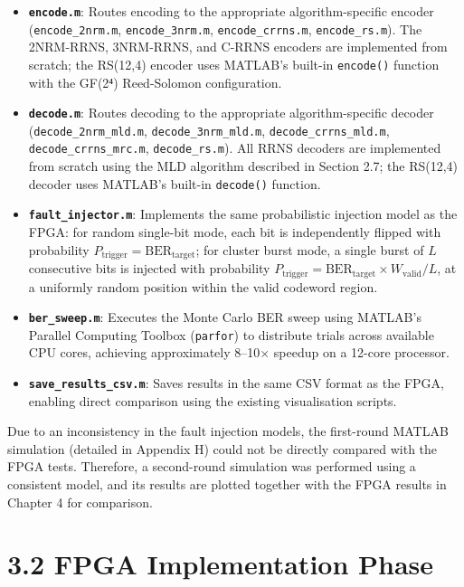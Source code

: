 \documentclass[
  english,
  12pt,
]{report}
\providecommand{\tightlist}{%
  \setlength{\itemsep}{0pt}\setlength{\parskip}{0pt}}
\begin{document}
\begin{itemize}
\tightlist
\item
  \textbf{\texttt{encode.m}}: Routes encoding to the appropriate
  algorithm-specific encoder (\texttt{encode\_2nrm.m},
  \texttt{encode\_3nrm.m}, \texttt{encode\_crrns.m},
  \texttt{encode\_rs.m}). The 2NRM-RRNS, 3NRM-RRNS, and C-RRNS encoders
  are implemented from scratch; the RS(12,4) encoder uses MATLAB's
  built-in \texttt{encode()} function with the GF(2⁴) Reed-Solomon
  configuration.
\item
  \textbf{\texttt{decode.m}}: Routes decoding to the appropriate
  algorithm-specific decoder (\texttt{decode\_2nrm\_mld.m},
  \texttt{decode\_3nrm\_mld.m}, \texttt{decode\_crrns\_mld.m},
  \texttt{decode\_crrns\_mrc.m}, \texttt{decode\_rs.m}). All RRNS
  decoders are implemented from scratch using the MLD algorithm
  described in Section 2.7; the RS(12,4) decoder uses MATLAB's built-in
  \texttt{decode()} function.
\item
  \textbf{\texttt{fault\_injector.m}}: Implements the same probabilistic
  injection model as the FPGA: for random single-bit mode, each bit is
  independently flipped with probability
  \(P_{\text{trigger}} = \text{BER}_{\text{target}}\); for cluster burst
  mode, a single burst of \(L\) consecutive bits is injected with
  probability
  \(P_{\text{trigger}} = \text{BER}_{\text{target}} \times W_{\text{valid}} / L\),
  at a uniformly random position within the valid codeword region.
\item
  \textbf{\texttt{ber\_sweep.m}}: Executes the Monte Carlo BER sweep
  using MATLAB's Parallel Computing Toolbox (\texttt{parfor}) to
  distribute trials across available CPU cores, achieving approximately
  8--10× speedup on a 12-core processor.
\item
  \textbf{\texttt{save\_results\_csv.m}}: Saves results in the same CSV
  format as the FPGA, enabling direct comparison using the existing
  visualisation scripts.
\end{itemize}

Due to an inconsistency in the fault injection models, the first-round
MATLAB simulation (detailed in Appendix H) could not be directly
compared with the FPGA tests. Therefore, a second-round simulation was
performed using a consistent model, and its results are plotted together
with the FPGA results in Chapter 4 for comparison.

\section{3.2 FPGA Implementation Phase}\label{fpga-implementation-phase}
\end{document}
